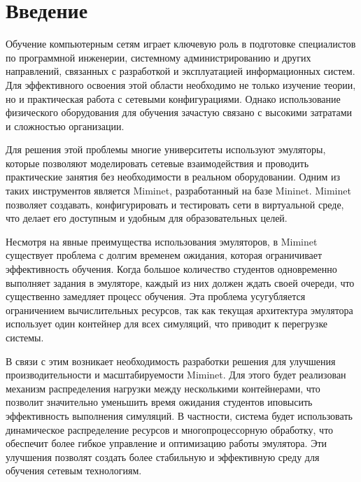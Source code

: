 
\section*{Введение}
\thispagestyle{withCompileDate}



Обучение компьютерным сетям играет ключевую роль в подготовке специалистов по программной инженерии, системному администрированию и других направлений, связанных с разработкой и эксплуатацией информационных систем.
Для эффективного освоения этой области необходимо не только изучение теории, но и практическая работа с сетевыми конфигурациями.
Однако использование физического оборудования для обучения зачастую связано с высокими затратами и сложностью организации.

Для решения этой проблемы многие университеты используют эмуляторы, которые позволяют моделировать сетевые взаимодействия и проводить практические занятия без необходимости в реальном оборудовании.
Одним из таких инструментов является Miminet\cite{miminet}, разработанный на базе Mininet\cite{mininet}. Miminet\cite{miminet} позволяет создавать, конфигурировать и тестировать сети в виртуальной среде, что делает его доступным и удобным для образовательных целей.

Несмотря на явные преимущества использования эмуляторов, в Miminet\cite{miminet} существует проблема с долгим временем ожидания, которая ограничивает эффективность обучения. Когда большое количество студентов одновременно выполняет задания в эмуляторе, каждый из них должен ждать своей очереди, что существенно замедляет процесс обучения.
Эта проблема усугубляется ограничением вычислительных ресурсов, так как текущая архитектура эмулятора использует один контейнер для всех симуляций, что приводит к перегрузке системы.

В связи с этим возникает необходимость разработки решения для улучшения производительности и масштабируемости Miminet\cite{miminet}.
Для этого будет реализован механизм распределения нагрузки между несколькими контейнерами, что позволит значительно уменьшить время ожидания студентов иповысить эффективность выполнения симуляций.
В частности, система будет использовать динамическое распределение ресурсов и многопроцессорную обработку, что обеспечит более гибкое управление и оптимизацию работы эмулятора.
Эти улучшения позволят создать более стабильную и эффективную среду для обучения сетевым технологиям.
